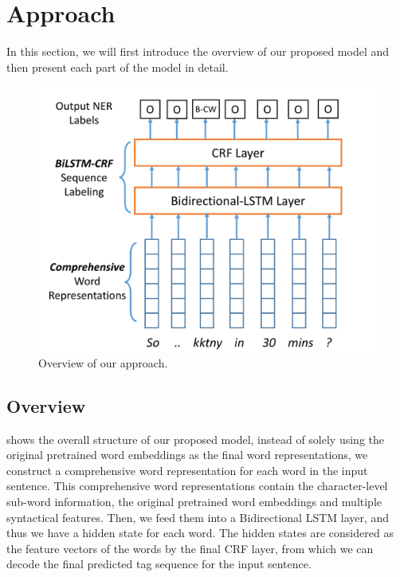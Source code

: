 \section{Approach}
\label{sec:approach}
In this section, we will first introduce the overview of our proposed model and then present each part of the model in detail.

\begin{figure}
	\includegraphics[width=\columnwidth]{figures/overview}
	\caption{Overview of our approach.}
	\label{fig:overall}
\end{figure}

\subsection{Overview}
 shows the overall structure of our proposed model, 
instead of solely using the original pretrained word embeddings as the final word representations, 
we construct a comprehensive word representation for each word in the input sentence.
This comprehensive word representations contain the character-level sub-word information, the original pretrained word embeddings and multiple syntactical features. 
Then, we feed them into a Bidirectional LSTM layer, and thus we have a hidden state for each word. 
The hidden states are considered as the feature vectors of the words by the final CRF layer, from which we can decode the final predicted tag sequence for the input sentence.

